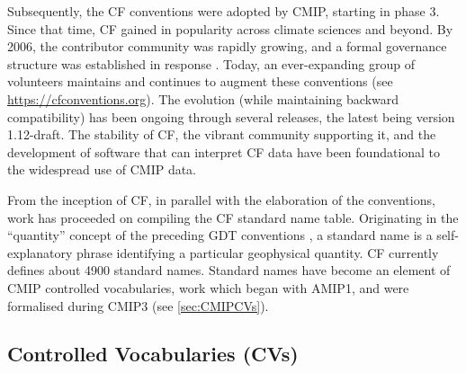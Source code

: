 \documentclass[manuscript]{copernicus}
\newcommand{\mycomment}[1]{}
\begin{document}
Subsequently, the CF conventions were adopted by CMIP, starting in phase 3. Since that time, CF gained in popularity across climate sciences and beyond. By 2006, the contributor community was rapidly growing, and a formal governance structure was established in response \citep{lawrence_maintaining_2006}. Today, an ever-expanding group of volunteers maintains and continues to augment these conventions (see \url{https://cfconventions.org}). The evolution (while maintaining backward compatibility) has been ongoing through several releases, the latest being version 1.12-draft. The stability of CF, the vibrant community supporting it, and the development of software that can interpret CF data have been foundational to the widespread use of CMIP data.

From the inception of CF, in parallel with the elaboration of the conventions, work has proceeded on compiling the CF standard name table. Originating in the ``quantity'' concept of the preceding GDT conventions \citep{gregory_gdt_1999}, a standard name is a self-explanatory phrase identifying a particular geophysical quantity. CF currently defines about 4900 standard names. Standard names have become an element of CMIP controlled vocabularies, work which began with AMIP1, and were formalised during CMIP3 (see \autoref{sec:CMIPCVs}).

\mycomment{
https://www.unidata.ucar.edu/software/netcdf/conventions.html
https://www.unidata.ucar.edu/software/netcdf/coords/proposals.html
COARDS 1995 - https://web.archive.org/web/20100527095818/http://ferret.wrc.noaa.gov/noaa_coop/coop_cdf_profile.html
GDT 1997
https://www.unidata.ucar.edu/mailing_lists/archives/netcdfgroup/1997/msg00080.html
https://www.unidata.ucar.edu/software/netcdf/coords/0054.html 1997
https://web.archive.org/web/20100610102527/http://www-pcmdi.llnl.gov/drach/GDT_convention.html 1999
https://web.archive.org/web/20040604041414/http://www-pcmdi.llnl.gov/drach/netCDF.html
CF 2003 - https://cfconventions.org/Data/cf-conventions/cf-conventions-1.11/cf-conventions.html#_version_1_0_28_october_2003 
}


\subsection{Controlled Vocabularies (CVs)}
\label{sec:CMIPCVs}
\mycomment{
\textbf{Attn: IPSL folks; MIP era realm evolution, dovetailing Variable request section}
Google docs yet to be finalized
CMIP6 global atts - https://docs.google.com/document/d/1h0r8RZr_f3-8egBMMh7aqLwy3snpD6_MrDz1q8n5XUk/edit
CMIP6 output metadata reqs - https://docs.google.com/document/d/1os9rZ11U0ajY7F8FWtgU4B49KcB59aFlBVGfLC4ahXs/edit
XML filenames/exps across eras - https://docs.google.com/document/d/1bUwK6G_fVZO53UjLZbQUOuBP47PsT8lqKKhL1pjRnKg/edit
CMIP5 standard output update - https://docs.google.com/document/d/1qOrdq6YOv8Tyx_NuqfKEw_EFBX_cvp8WTmRDzfuqn5s/edit
}
\end{document}
